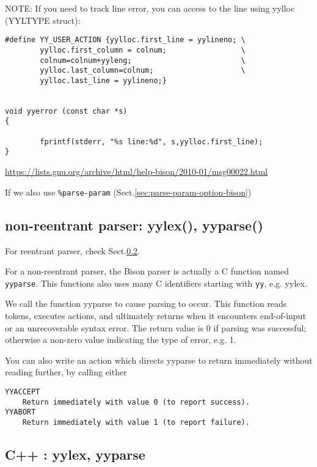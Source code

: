 NOTE: If you need to track line error, you can access to the line using yylloc (YYLTYPE struct):

\begin{verbatim}
#define YY_USER_ACTION {yylloc.first_line = yylineno; \
        yylloc.first_column = colnum;                 \
        colnum=colnum+yyleng;                         \
        yylloc.last_column=colnum;                    \
        yylloc.last_line = yylineno;}


void yyerror (const char *s)
{

        fprintf(stderr, "%s line:%d", s,yylloc.first_line);
}

\end{verbatim}
\url{https://lists.gnu.org/archive/html/help-bison/2010-01/msg00022.html}


If we also use \verb!%parse-param! (Sect.\ref{sec:parse-param-option-bison})

\subsection{non-reentrant parser: yylex(), yyparse()}
\label{sec:yyparse}

For reentrant parser, check Sect.\ref{sec:yyparse-C++}.

For a non-reentrant parser, the Bison parser is actually a C function named
\verb!yyparse!. This functions also uses many C identifiers starting with
\verb!yy!, e.g. yylex.



\begin{mdframed}

We call the function yyparse to cause parsing to occur.
This function reads tokens, executes actions, and ultimately returns when it
encounters end-of-input or an unrecoverable syntax error.
The return value is 0 if parsing was successful; otherwise a non-zero value
indicating the type of error, e.g. 1.

You can also write an action which directs yyparse to return immediately without reading further, by calling either
\begin{verbatim}
YYACCEPT
    Return immediately with value 0 (to report success).
YYABORT
    Return immediately with value 1 (to report failure).
\end{verbatim}

\end{mdframed}

\subsection{C++ : yylex, yyparse}
\label{sec:yyparse-C++}
\label{sec:yylex-C++}

